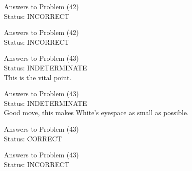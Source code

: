 \documentclass[11pt]{article}
\begin{document}
\begin{minipage}[t]{0.5\textwidth}
  {\centering
  
  Answers to Problem (42)\\
  Status: INCORRECT\\
  
  }
\end{minipage}
\begin{minipage}[t]{0.5\textwidth}
  {\centering
  
  Answers to Problem (42)\\
  Status: INCORRECT\\
  
  }
\end{minipage}
\begin{minipage}[t]{0.5\textwidth}
  {\centering
  
  Answers to Problem (43)\\
  Status: INDETERMINATE\\
  This is the vital point.\\
  }
\end{minipage}
\begin{minipage}[t]{0.5\textwidth}
  {\centering
  
  Answers to Problem (43)\\
  Status: INDETERMINATE\\
  Good move, this makes White's eyespace as small as possible.\\
  }
\end{minipage}
\begin{minipage}[t]{0.5\textwidth}
  {\centering
  
  Answers to Problem (43)\\
  Status: CORRECT\\
  
  }
\end{minipage}
\begin{minipage}[t]{0.5\textwidth}
  {\centering
  
  Answers to Problem (43)\\
  Status: INCORRECT\\
  
  }
\end{minipage}
\end{document}
